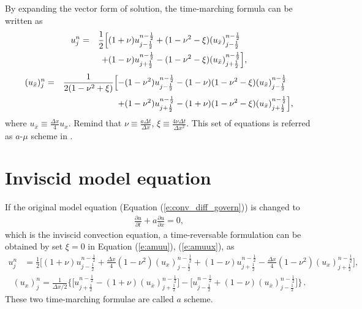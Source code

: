 \documentclass[11pt,dvips]{article}
\numberwithin{equation}{section}
\begin{document}
By expanding the vector form of solution, the time-marching formula can be
written as
\begin{alignat}{2}
  u_j^n &= &\frac{1}{2}\Big[
    &(1+\nu)u_{j-\frac{1}{2}}^{n-\frac{1}{2}}
    + (1-\nu^2-\xi)(u_{\bar{x}})_{j-\frac{1}{2}}^{n-\frac{1}{2}}
    \notag \\
  &&+ &(1-\nu)u_{j+\frac{1}{2}}^{n-\frac{1}{2}}
    - (1-\nu^2-\xi)(u_{\bar{x}})_{j+\frac{1}{2}}^{n-\frac{1}{2}}
           \Big] \label{e:amuu},
\end{alignat}
\begin{alignat}{2}
  (u_{\bar{x}})_j^n &= &\frac{1}{2(1-\nu^2+\xi)}\Big[
    -& (1-\nu^2)u_{j-\frac{1}{2}}^{n-\frac{1}{2}}
    -  (1-\nu)(1-\nu^2-\xi)(u_{\bar{x}})_{j-\frac{1}{2}}^{n-\frac{1}{2}}
    \notag \\
  &&+& (1-\nu^2)u_{j+\frac{1}{2}}^{n-\frac{1}{2}}
    -  (1+\nu)(1-\nu^2-\xi)(u_{\bar{x}})_{j+\frac{1}{2}}^{n-\frac{1}{2}}
                       \Big] \label{e:amuux},
\end{alignat}
where $u_{\bar{x}}\equiv\frac{\Delta x}{4}u_x$.  Remind that
$\nu\equiv\frac{a\Delta t}{\Delta x}$, $\xi\equiv\frac{4\nu\Delta t}{\Delta
x^2}$.  This set of equations is referred as $a$-$\mu$ scheme in
\cite{chang_method_1995}.

\section{Inviscid model equation}
\label{s:inviscid_model}

If the original model equation (Equation (\ref{e:conv_diff_govern}))
is changed to
\begin{align}
  \frac{\partial u}{\partial t} + a\frac{\partial u}{\partial x} = 0,
    \label{e:conv_govern}
\end{align}
which is the inviscid convection equation, a time-reversable formulation can be
obtained by set $\xi=0$ in Equation (\ref{e:amuu}), (\ref{e:amuux}), as
\begin{align}
  u_j^n &= \frac{1}{2}\Big[
      (1+\nu)u_{j-\frac{1}{2}}^{n-\frac{1}{2}}
    + \frac{\Delta x}{4}(1-\nu^2)(u_x)_{j-\frac{1}{2}}^{n-\frac{1}{2}}
    + (1-\nu)u_{j+\frac{1}{2}}^{n-\frac{1}{2}}
    - \frac{\Delta x}{4}(1-\nu^2)(u_x)_{j+\frac{1}{2}}^{n-\frac{1}{2}}
  \Big], \label{e:au}
\end{align}
\begin{align}
  (u_x)_j^n = \frac{1}{\Delta x/2}\Big\{
      \Big[ u_{j+\frac{1}{2}}^{n-\frac{1}{2}}
         - (1+\nu)(u_{\bar{x}})_{j+\frac{1}{2}}^{n-\frac{1}{2}} \Big]
    - \Big[ u_{j-\frac{1}{2}}^{n-\frac{1}{2}}
         + (1-\nu)(u_{\bar{x}})_{j-\frac{1}{2}}^{n-\frac{1}{2}} \Big]
  \Big\} \label{e:aux}\,.
\end{align}
These two time-marching formulae are called $a$ scheme.
\end{document}
